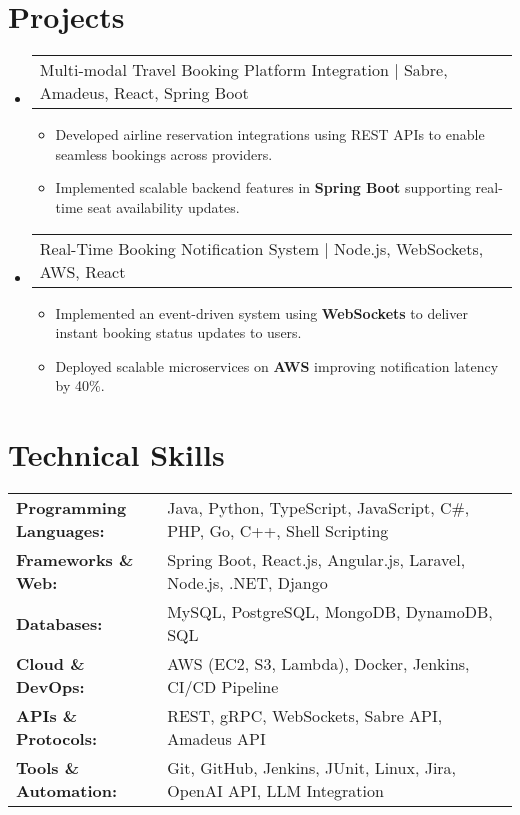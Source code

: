 \documentclass[letterpaper,11pt]{article}
\makeatletter
\newcommand{\resumeItem}[1]{
  \item\footnotesize{
    {#1 \vspace{-2pt}}
  }
}
\newcommand{\resumeProjectHeading}[2]{
    \item
    \begin{tabular*}{1.001\textwidth}{l@{\extracolsep{\fill}}r}
      \small#1 & \textbf{\small #2}\\
    \end{tabular*}\vspace{-7pt}
}
\newcommand{\resumeSubHeadingListStart}{\begin{itemize}[leftmargin=0pt, label={}]}
\newcommand{\resumeSubHeadingListEnd}{\end{itemize}}
\newcommand{\resumeItemListStart}{\begin{itemize}[leftmargin=*]}
\newcommand{\resumeItemListEnd}{\end{itemize}\vspace{-5pt}}
\makeatother
\begin{document}
\section{Projects}
    \vspace{-5pt}
    \resumeSubHeadingListStart
      \resumeProjectHeading
          {Multi-modal Travel Booking Platform Integration | Sabre, Amadeus, React, Spring Boot}{}
          \resumeItemListStart
              \resumeItem{Developed airline reservation integrations using REST APIs to enable seamless bookings across providers.}
              \resumeItem{Implemented scalable backend features in \textbf{Spring Boot} supporting real-time seat availability updates.}
          \resumeItemListEnd
          \vspace{-16pt}
      \resumeProjectHeading
          {Real-Time Booking Notification System | Node.js, WebSockets, AWS, React}{}
          \resumeItemListStart
              \resumeItem{Implemented an event-driven system using \textbf{WebSockets} to deliver instant booking status updates to users.}
              \resumeItem{Deployed scalable microservices on \textbf{AWS} improving notification latency by 40\%.}
          \resumeItemListEnd
          \vspace{-16pt}
    \resumeSubHeadingListEnd
\vspace{-10pt}
\section{Technical Skills}
        \vspace{-14pt}
        \begin{table}[h]
            \footnotesize
            \begin{tabular}{p{0.3\linewidth} p{0.7\linewidth}}
                \textbf{Programming Languages:} & Java, Python, TypeScript, JavaScript, C\#, PHP, Go, C++, Shell Scripting \\
                \textbf{Frameworks \& Web:} & Spring Boot, React.js, Angular.js, Laravel, Node.js, .NET, Django \\
                \textbf{Databases:} & MySQL, PostgreSQL, MongoDB, DynamoDB, SQL \\
                \textbf{Cloud \& DevOps:} & AWS (EC2, S3, Lambda), Docker, Jenkins, CI/CD Pipeline \\
                \textbf{APIs \& Protocols:} & REST, gRPC, WebSockets, Sabre API, Amadeus API \\
                \textbf{Tools \& Automation:} & Git, GitHub, Jenkins, JUnit, Linux, Jira, OpenAI API, LLM Integration \\
            \end{tabular}
        \end{table}
\end{document}
